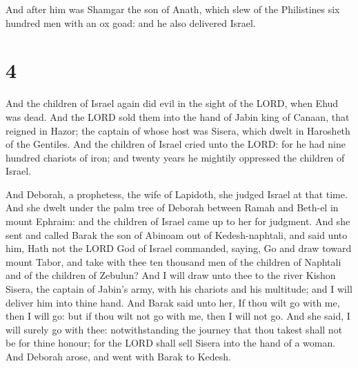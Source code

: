  And after him was Shamgar the son of Anath, which slew
of the Philistines six hundred men with an ox goad: and he also
delivered Israel.

\hypertarget{section-3}{%
\section{4}\label{section-3}}

 And the children of Israel again did evil in the sight of
the LORD, when Ehud was dead.  And the LORD sold them into
the hand of Jabin king of Canaan, that reigned in Hazor; the captain of
whose host was Sisera, which dwelt in Harosheth of the Gentiles.
 And the children of Israel cried unto the LORD: for he had
nine hundred chariots of iron; and twenty years he mightily oppressed
the children of Israel.

 And Deborah, a prophetess, the wife of Lapidoth, she
judged Israel at that time.  And she dwelt under the palm
tree of Deborah between Ramah and Beth-el in mount Ephraim: and the
children of Israel came up to her for judgment.  And she
sent and called Barak the son of Abinoam out of Kedesh-naphtali, and
said unto him, Hath not the LORD God of Israel commanded, saying, Go and
draw toward mount Tabor, and take with thee ten thousand men of the
children of Naphtali and of the children of Zebulun?  And I
will draw unto thee to the river Kishon Sisera, the captain of Jabin's
army, with his chariots and his multitude; and I will deliver him into
thine hand.  And Barak said unto her, If thou wilt go with
me, then I will go: but if thou wilt not go with me, then I will not go.
 And she said, I will surely go with thee: notwithstanding
the journey that thou takest shall not be for thine honour; for the LORD
shall sell Sisera into the hand of a woman. And Deborah arose, and went
with Barak to Kedesh.

